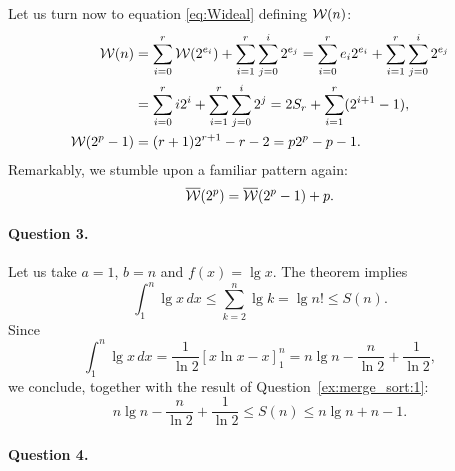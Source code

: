 Let us turn now to equation \eqref{eq:Wideal} 
defining \(\mathcal{W}(n)\):
\begin{align*}
\mathcal{W}(n)
  &=   \sum_{i=0}^{r}{\mathcal{W}(2^{e_i})}
     + \sum_{i=1}^{r}\sum_{j=0}^{i}{2^{e_j}}
   =   \sum_{i=0}^{r}{e_i2^{e_i}}
     + \sum_{i=1}^{r}\sum_{j=0}^{i}{2^{e_j}}\\
  &=   \sum_{i=0}^{r}{i2^{i}}
     + \sum_{i=1}^{r}\sum_{j=0}^{i}{2^{j}}
   = 2S_r + \sum_{i=1}^{r}(2^{i+1} - 1),\\
\mathcal{W}(2^p-1)
  &= (r+1)2^{r+1} - r - 2
   = p2^p - p - 1.
\end{align*}
Remarkably, we stumble upon a familiar pattern again:
\begin{equation}
\overline{\mathcal{W}}(2^p) = \overline{\mathcal{W}}(2^p-1) + p.\label{eq:Wcomp}
\end{equation}

\medskip

\paragraph{Question 3.}

Let us take \(a=1\), \(b=n\) and \(f(x) = \lg x\). The theorem implies
\[
\int_{1}^{n}{\!\!\lg x} \,dx \leqslant \sum_{k=2}^{n}{\lg k} = \lg n!
\leqslant S(n).
\]
Since
\[
\int_{1}^{n}{\!\!\lg x}\,dx = \frac{1}{\ln 2}[x\ln x - x]^{n}_1 = n\lg n -
\frac{n}{\ln 2} + \frac{1}{\ln 2},
\]
we conclude, together with the result of Question~\ref{ex:merge_sort:1}:
\[
n\lg n - \frac{n}{\ln 2} + \frac{1}{\ln 2}
\leqslant S(n) \leqslant n\lg n + n - 1.
\]

\medskip

\paragraph{Question 4.}

